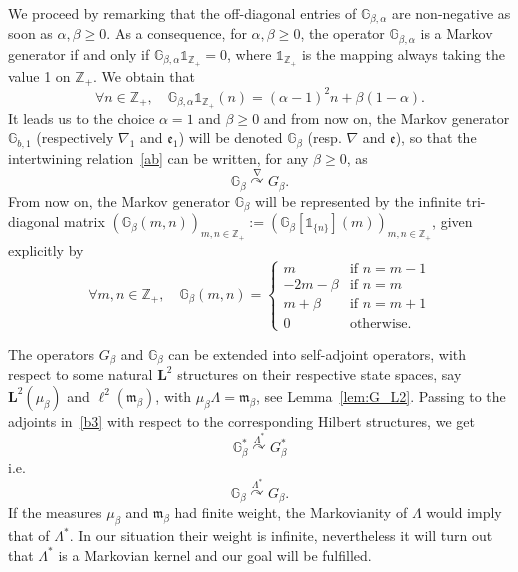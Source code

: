 \documentclass[AHL,Unicode,longabstracts]{cedram}
\newcommand{\df}{\mathrel{:=}}
\newcommand{\ZZ}{\mathbb{Z}}
\newcommand{\fe}{\mathfrak{e}}
\newcommand{\fm}{\mathfrak{m}}
\newcommand{\na}{\nabla}
\newcommand{\un}{\mathds{1}}
\newcommand{\dBg}{{\discret{G}}}
\newcommand{\Bg}{G}
\newcommand{\esL}{\mathbf{L}}
\newcommand{\esLd}{\ell}
\newcommand{\discret}[1]{\mathds{#1}}
\newcommand{\adjL}{\Lambda^*}
\newcommand{\Gate}[3]{#1\stackrel{#2}{\curvearrowright}#3}
\let\oldforall\forall
\renewcommand*{\forall}{\mathrel{\oldforall}}
\begin{document}
We proceed by remarking that the off-diagonal entries of $\dBg_{\beta,\alpha}$ are non-negative as soon as $\alpha, \beta\geq 0$. As a consequence, for $\alpha, \beta\geq 0$, the operator $\dBg_{\beta,\alpha}$ is a Markov generator if and only if $\dBg_{\beta,\alpha}\un_{\ZZ_+}=0$, where $\un_{\ZZ_+}$ is the mapping always taking the value 1 on $\ZZ_+$. We obtain that
\[
\forall n\in\ZZ_+,\quad \dBg_{\beta,\alpha}\un_{\ZZ_+}(n)=(\alpha-1)^2n+\beta(1-\alpha).
\]
It leads us to the choice $\alpha=1$ and $\beta\geq 0$ and from now on, the Markov generator $\dBg_{b,1}$ (respectively $\na_1$ and $\fe_1$) will be denoted $\dBg_{\beta}$ (resp. $\na$ and $\fe$), so that the intertwining relation~\eqref{ab} can be written, for any $\beta\geq 0$, as
\begin{equation}\label{bb}
\Gate{\dBg_{\beta}}{\na}{\Bg_{\beta}}.
\end{equation}
From now on, the Markov generator $\dBg_{\beta}$ will be represented by the infinite tri-diagonal matrix $(\dBg_{\beta}(m,n))_{m,n\in\ZZ_+}\df (\dBg_{\beta}[\un_{\{n\}}](m))_{m,n\in\ZZ_+}$, given explicitly by
\begin{equation}\label{dBg}
\forall m,n\in \ZZ_+,\quad
\dBg_{\beta}(m,n)=
\begin{cases}
m&\text{if $n=m-1$}\\
-2m-\beta&\text{if $n=m$}\\
m+\beta&\text{if $n=m+1$}\\
0&\text{otherwise.}
\end{cases}
\end{equation}

The operators $\Bg_{\beta}$ and $\dBg_{\beta}$ can be extended into self-adjoint operators, with respect to some natural $\esL^2$ structures on their respective state spaces, say $\esL^2(\mu_{\beta})$ and $\esLd^2(\fm_{\beta})$, with $\mu_{\beta}\Lambda=\fm_{\beta}$, see Lemma~\ref{lem:G_L2}. Passing to the adjoints in~\eqref{b3} with respect to the corresponding Hilbert structures, we get
\begin{equation}\label{dd1}
\Gate{\dBg_{\beta}^*}{\adjL}{\Bg_{\beta}^*}
\end{equation}
i.e.
\begin{equation}\label{dd2}
\Gate{\dBg_{\beta}}{\adjL}{\Bg_{\beta}}.
\end{equation}
If the measures $\mu_{\beta}$ and $\fm_{\beta}$ had finite weight, the Markovianity of $\Lambda$ would imply that of $\adjL$. In our situation their weight is infinite, nevertheless it will turn out that $\adjL$ is a Markovian kernel and our goal will be fulfilled.
\end{document}
